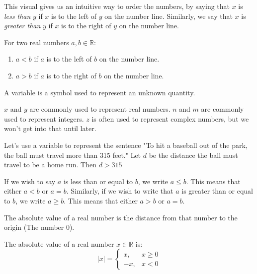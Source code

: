 \documentclass[crop=false,class=book,oneside]{standalone}
\begin{document}
        This visual gives us an intuitive way to order the numbers,
        by saying that $x$ is \textit{less than} $y$ if $x$ is
        to the left of $y$ on the number line. Similarly, we say
        that $x$ is \textit{greater than} $y$ if $x$ is to the
        right of $y$ on the number line.
        \begin{properties}
            For two real numbers $a,b\in \mathbb{R}$:
            \begin{enumerate}
                \item $a<b$ if $a$ is to the left of $b$ on the number line.
                \item $a>b$ if $a$ is to the right of $b$ on the number line.
            \end{enumerate}
        \end{properties}
        \begin{definition}
        A variable is a symbol used to represent an unknown quantity.
        \end{definition}
        \begin{example}
        $x$ and $y$ are commonly used to represent real numbers. $n$ and $m$ are commonly used to represent integers. $z$ is often used to represent complex numbers, but we won't get into that until later.
        \end{example}
        \begin{example}
        Let's use a variable to represent the sentence "To hit a baseball out of the park, the ball must travel more than 315 feet." Let $d$ be the distance the ball must travel to be a home run. Then $d>315$
        \end{example}
        \begin{notation}
        If we wish to say $a$ is less than or equal to $b$, we write $a\leq b$. This means that either $a<b$ or $a=b$. Similarly, if we wish to write that $a$ is greater than or equal to $b$, we write $a\geq b$. This means that either $a>b$ or $a=b$.
        \end{notation}
        The absolute value of a real number is the distance from that number to the origin (The number $0$).
        \begin{definition}
            The absolute value of a real number
            $x\in \mathbb{R}$ is:
            \begin{equation}
                |x|=
                \begin{cases}
                    x,&x\geq{0}\\
                    \minus{x},&x<0
                \end{cases}
            \end{equation}
        \end{definition}
\end{document}
